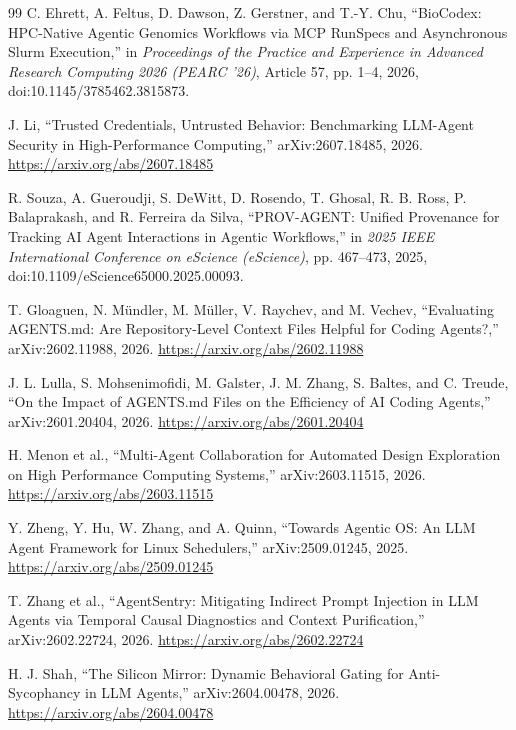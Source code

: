 \documentclass[11pt]{article}
\begin{document}
\begin{thebibliography}{99}
C. Ehrett, A. Feltus, D. Dawson, Z. Gerstner, and T.-Y. Chu,
``BioCodex: HPC-Native Agentic Genomics Workflows via MCP RunSpecs and Asynchronous Slurm Execution,''
in \textit{Proceedings of the Practice and Experience in Advanced Research Computing 2026 (PEARC '26)},
Article 57, pp. 1--4, 2026, doi:10.1145/3785462.3815873.

J. Li,
``Trusted Credentials, Untrusted Behavior: Benchmarking LLM-Agent Security in High-Performance Computing,''
arXiv:2607.18485, 2026.
\url{https://arxiv.org/abs/2607.18485}

R. Souza, A. Gueroudji, S. DeWitt, D. Rosendo, T. Ghosal, R. B. Ross,
P. Balaprakash, and R. Ferreira da Silva,
``PROV-AGENT: Unified Provenance for Tracking AI Agent Interactions in Agentic Workflows,''
in \textit{2025 IEEE International Conference on eScience (eScience)},
pp. 467--473, 2025, doi:10.1109/eScience65000.2025.00093.

T. Gloaguen, N. M\"undler, M. M\"uller, V. Raychev, and M. Vechev,
``Evaluating AGENTS.md: Are Repository-Level Context Files Helpful for Coding Agents?,''
arXiv:2602.11988, 2026.
\url{https://arxiv.org/abs/2602.11988}

J. L. Lulla, S. Mohsenimofidi, M. Galster, J. M. Zhang, S. Baltes, and C. Treude,
``On the Impact of AGENTS.md Files on the Efficiency of AI Coding Agents,''
arXiv:2601.20404, 2026.
\url{https://arxiv.org/abs/2601.20404}

H. Menon et al.,
``Multi-Agent Collaboration for Automated Design Exploration on High Performance Computing Systems,''
arXiv:2603.11515, 2026.
\url{https://arxiv.org/abs/2603.11515}

Y. Zheng, Y. Hu, W. Zhang, and A. Quinn,
``Towards Agentic OS: An LLM Agent Framework for Linux Schedulers,''
arXiv:2509.01245, 2025.
\url{https://arxiv.org/abs/2509.01245}

T. Zhang et al.,
``AgentSentry: Mitigating Indirect Prompt Injection in LLM Agents via Temporal Causal Diagnostics and Context Purification,''
arXiv:2602.22724, 2026.
\url{https://arxiv.org/abs/2602.22724}

H. J. Shah,
``The Silicon Mirror: Dynamic Behavioral Gating for Anti-Sycophancy in LLM Agents,''
arXiv:2604.00478, 2026.
\url{https://arxiv.org/abs/2604.00478}


\end{thebibliography}
\end{document}
